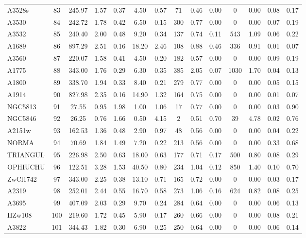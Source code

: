 \documentclass[10pt,aps,pra,reprint,amsmath,amsfonts,amssymb,showpacs,nofootinbib,floatfix]{revtex4-1}
\newcommand{\vst}{\vspace{-0.14mm}}
\begin{document}
\begin{table}
\begin{minipage}{2.0\columnwidth}
\begin{tabular}{l c c c c c c c c c c c c c}
A3528s & 83 & 245.97 & 1.57 & 0.37 & 4.50 & 0.57 & 71 & 0.46 & 0.00 & 0 & 0.00 & 0.08 & 0.17 \vst \\
A3530 & 84 & 242.72 & 1.78 & 0.42 & 6.50 & 0.15 & 300 & 0.77 & 0.00 & 0 & 0.00 & 0.07 & 0.19 \vst \\
A3532 & 85 & 240.40 & 2.00 & 0.48 & 9.20 & 0.34 & 137 & 0.74 & 0.11 & 543 & 1.09 & 0.06 & 0.22 \vst \\
A1689 & 86 & 897.29 & 2.51 & 0.16 & 18.20 & 2.46 & 108 & 0.88 & 0.46 & 336 & 0.91 & 0.01 & 0.07 \vst \\
A3560 & 87 & 220.07 & 1.58 & 0.41 & 4.50 & 0.20 & 182 & 0.57 & 0.00 & 0 & 0.00 & 0.09 & 0.19 \vst \\
A1775 & 88 & 343.00 & 1.76 & 0.29 & 6.30 & 0.35 & 385 & 2.05 & 0.07 & 1030 & 1.70 & 0.04 & 0.13 \vst \\
A1800 & 89 & 338.70 & 1.94 & 0.33 & 8.40 & 0.21 & 279 & 0.77 & 0.00 & 0 & 0.00 & 0.05 & 0.15 \vst \\
A1914 & 90 & 827.98 & 2.35 & 0.16 & 14.90 & 1.32 & 164 & 0.75 & 0.00 & 0 & 0.00 & 0.01 & 0.07 \vst \\
NGC5813 & 91 & 27.55 & 0.95 & 1.98 & 1.00 & 1.06 & 17 & 0.77 & 0.00 & 0 & 0.00 & 0.03 & 0.90 \vst \\
NGC5846 & 92 & 26.25 & 0.76 & 1.66 & 0.50 & 4.15 & 2 & 0.51 & 0.70 & 39 & 4.78 & 0.02 & 0.76 \vst \\
A2151w & 93 & 162.53 & 1.36 & 0.48 & 2.90 & 0.97 & 48 & 0.56 & 0.00 & 0 & 0.00 & 0.04 & 0.22 \vst \\
NORMA & 94 & 70.69 & 1.84 & 1.49 & 7.20 & 0.22 & 213 & 0.56 & 0.00 & 0 & 0.00 & 0.33 & 0.68 \vst \\
TRIANGUL & 95 & 226.98 & 2.50 & 0.63 & 18.00 & 0.63 & 177 & 0.71 & 0.17 & 500 & 0.80 & 0.08 & 0.29 \vst \\
OPHIUCHU & 96 & 122.51 & 3.28 & 1.53 & 40.50 & 0.80 & 234 & 1.04 & 0.12 & 850 & 1.40 & 0.10 & 0.70 \vst \\
ZwCl1742 & 97 & 343.00 & 2.25 & 0.38 & 13.10 & 0.71 & 165 & 0.72 & 0.00 & 0 & 0.00 & 0.03 & 0.17 \vst \\
A2319 & 98 & 252.01 & 2.44 & 0.55 & 16.70 & 0.58 & 273 & 1.06 & 0.16 & 624 & 0.82 & 0.08 & 0.25 \vst \\
A3695 & 99 & 407.09 & 2.03 & 0.29 & 9.70 & 0.24 & 284 & 0.64 & 0.00 & 0 & 0.00 & 0.06 & 0.13 \vst \\
IIZw108 & 100 & 219.60 & 1.72 & 0.45 & 5.90 & 0.17 & 260 & 0.66 & 0.00 & 0 & 0.00 & 0.08 & 0.21 \vst \\
A3822 & 101 & 344.43 & 1.82 & 0.30 & 6.90 & 0.25 & 250 & 0.64 & 0.00 & 0 & 0.00 & 0.06 & 0.14 \vst \\

\end{tabular}
\end{minipage}
\end{table}
\end{document}
